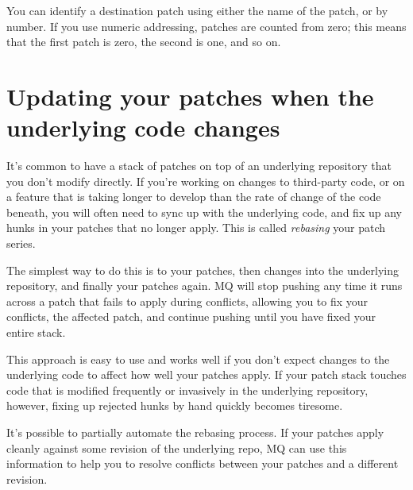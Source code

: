 You can identify a destination patch using either the name of the
patch, or by number.  If you use numeric addressing, patches are
counted from zero; this means that the first patch is zero, the second
is one, and so on.

\section{Updating your patches when the underlying code changes}
\label{sec:mq:merge}

It's common to have a stack of patches on top of an underlying
repository that you don't modify directly.  If you're working on
changes to third-party code, or on a feature that is taking longer to
develop than the rate of change of the code beneath, you will often
need to sync up with the underlying code, and fix up any hunks in your
patches that no longer apply.  This is called \emph{rebasing} your
patch series.

The simplest way to do this is to 
your patches, then  changes into the underlying
repository, and finally  your
patches again.  MQ will stop pushing any time it runs across a patch
that fails to apply during conflicts, allowing you to fix your
conflicts,  the affected patch, and continue pushing
until you have fixed your entire stack.

This approach is easy to use and works well if you don't expect
changes to the underlying code to affect how well your patches apply.
If your patch stack touches code that is modified frequently or
invasively in the underlying repository, however, fixing up rejected
hunks by hand quickly becomes tiresome.

It's possible to partially automate the rebasing process.  If your
patches apply cleanly against some revision of the underlying repo, MQ
can use this information to help you to resolve conflicts between your
patches and a different revision.

